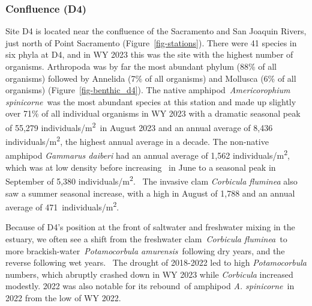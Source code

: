 \documentclass[
]{article}
\begin{document}
\hypertarget{confluence-d4}{%
\subsubsection{Confluence (D4)}\label{confluence-d4}}

Site D4 is located near the confluence of the Sacramento and San Joaquin
Rivers, just north of Point Sacramento (Figure~\ref{fig-stations}).
There were 41 species in six phyla at D4, and in WY 2023 this was the
site with the highest number of organisms. Arthropoda was by far the
most abundant phylum (88\% of all organisms) followed by Annelida (7\%
of all organisms) and Mollusca (6\% of all organisms)
(Figure~\ref{fig-benthic_d4}). The native amphipod~\emph{Americorophium
spinicorne}~was the most abundant species at this station and made up
slightly over 71\% of all individual organisms in WY 2023 with a
dramatic seasonal peak of 55,279 individuals/m\textsuperscript{2}~in
August 2023 and an annual average of 8,436
individuals/m\textsuperscript{2}, the highest annual average in a
decade. The non-native amphipod \emph{Gammarus daiberi} had an annual
average of 1,562 individuals/m\textsuperscript{2}, which was at low
density before increasing~ in June to a seasonal peak in September of
5,380 individuals/m\textsuperscript{2}.~ The invasive clam
\emph{Corbicula fluminea} also saw a summer seasonal increase, with a
high in August of 1,788 and an annual average of
471~individuals/m\textsuperscript{2}.

Because of D4's position at the front of saltwater and freshwater mixing
in the estuary, we often see a shift from the freshwater
clam~\emph{Corbicula fluminea}~to more
brackish-water~\emph{Potamocorbula amurensis}~following dry years, and
the reverse following wet years.~ The drought of 2018-2022 led to high
\emph{Potamocorbula} numbers, which abruptly crashed down in WY 2023
while \emph{Corbicula} increased modestly. 2022 was also notable for its
rebound~of amphipod \emph{A. spinicorne}~in 2022 from the low of WY
2022.
\end{document}

